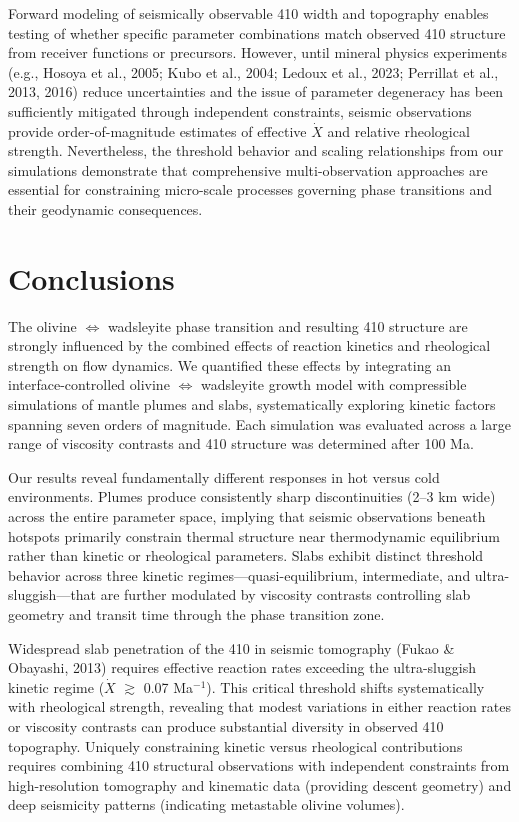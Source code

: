 \documentclass[draft,linenumbers]{agujournal2019}
\begin{document}
Forward modeling of seismically observable 410 width and topography
enables testing of whether specific parameter combinations match
observed 410 structure from receiver functions or precursors. However,
until mineral physics experiments (e.g., Hosoya et al., 2005; Kubo et
al., 2004; {Ledoux et al.}, 2023; Perrillat et al., 2013, 2016) reduce
uncertainties and the issue of parameter degeneracy has been
sufficiently mitigated through independent constraints, seismic
observations provide order-of-magnitude estimates of effective
\(\dot{X}\) and relative rheological strength. Nevertheless, the
threshold behavior and scaling relationships from our simulations
demonstrate that comprehensive multi-observation approaches are
essential for constraining micro-scale processes governing phase
transitions and their geodynamic consequences.

\section{Conclusions}\label{sec:conclusions}

The olivine \(\Leftrightarrow\) wadsleyite phase transition and
resulting 410 structure are strongly influenced by the combined effects
of reaction kinetics and rheological strength on flow dynamics. We
quantified these effects by integrating an interface-controlled olivine
\(\Leftrightarrow\) wadsleyite growth model with compressible
simulations of mantle plumes and slabs, systematically exploring kinetic
factors spanning seven orders of magnitude. Each simulation was
evaluated across a large range of viscosity contrasts and 410 structure
was determined after 100 Ma.

Our results reveal fundamentally different responses in hot versus cold
environments. Plumes produce consistently sharp discontinuities (2--3 km
wide) across the entire parameter space, implying that seismic
observations beneath hotspots primarily constrain thermal structure near
thermodynamic equilibrium rather than kinetic or rheological parameters.
Slabs exhibit distinct threshold behavior across three kinetic
regimes---quasi-equilibrium, intermediate, and ultra-sluggish---that are
further modulated by viscosity contrasts controlling slab geometry and
transit time through the phase transition zone.

Widespread slab penetration of the 410 in seismic tomography (Fukao \&
Obayashi, 2013) requires effective reaction rates exceeding the
ultra-sluggish kinetic regime (\(\dot{X}\) \(\gtrsim\) 0.07
Ma\(^{-1}\)). This critical threshold shifts systematically with
rheological strength, revealing that modest variations in either
reaction rates or viscosity contrasts can produce substantial diversity
in observed 410 topography. Uniquely constraining kinetic versus
rheological contributions requires combining 410 structural observations
with independent constraints from high-resolution tomography and
kinematic data (providing descent geometry) and deep seismicity patterns
(indicating metastable olivine volumes).
\end{document}
